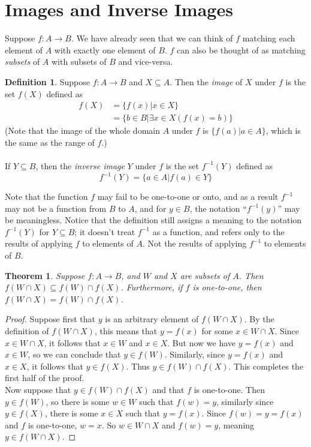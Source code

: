 \documentclass{report}
\newtheorem*{theorem}{Theorem}
\theoremstyle{definition}
\newtheorem*{definition}{Definition}
\begin{document}
\section{Images and Inverse Images}
Suppose $f:A\to B$. We have already seen that we can think of $f$ matching each element of $A$ with exactly one element of $B$. $f$ can also be thought of as
matching \textit{subsets} of $A$ with subsets of $B$ and vice-versa.
\begin{definition}
Suppose $f:A\to B$ and $X\subseteq A$. Then the \textit{image} of $X$ under $f$ is the set $f(X)$
defined as
\begin{align*}
f(X)&=\{f(x)|x\in X\}\\
&=\{b\in B|\exists x\in X(f(x)=b)\}
\end{align*}
(Note that the image of the whole domain $A$ under $f$ is $\{f(a)|a\in A\}$, which is the same as the range of $f$.)\\
\vspace{1mm}\\
If $Y\subseteq B$, then the \textit{inverse image} $Y$ under $f$ is the set $f^{-1}(Y)$ defined as
\begin{equation*}
f^{-1}(Y)=\{a\in A|f(a)\in Y\}
\end{equation*}
\end{definition}
\noindent Note that the function $f$ may fail to be one-to-one or onto, and as a result $f^{-1}$ may not be a function from $B$ to $A$, and for $y\in B$, the notation 
``$f^{-1}(y)$'' may be meaningless.
Notice that the definition still assigns a meaning to the notation $f^{-1}(Y)$ for $Y\subseteq B$; 
it doesn't treat $f^{-1}$ as a function, and refers only to the results of applying $f$ to elements
of $A$. Not the results of applying $f^{-1}$ to elements of $B$.
\begin{theorem}
Suppose $f:A\to B$, and $W$ and $X$ are subsets of $A$. Then $f(W\cap X)\subseteq f(W)\cap f(X)$. Furthermore, if $f$ is one-to-one, then $f(W\cap X)=f(W)\cap f(X)$.
\end{theorem}
\begin{proof}
Suppose first that $y$ is an arbitrary element of $f(W\cap X)$. By the definition of $f(W\cap X)$, this means that $y=f(x)$ for some $x\in W\cap X$. Since $x\in W\cap X$, it follows that 
$x\in W$ and $x\in X$. But now we have $y=f(x)$ and $x\in W$, so we can conclude that 
$y\in f(W)$. Similarly, since $y=f(x)$ and $x\in X$, it follows that $y\in f(X)$. 
Thus $y\in f(W)\cap f(X)$. This completes the first half of the proof.\\
\indent Now suppose that $y\in f(W)\cap f(X)$ and that $f$ is one-to-one. 
Then $y\in f(W)$, so there is some $w\in W$ such that $f(w)=y$, similarly since $y\in f(X)$, there is some $x\in X$ such that 
$y=f(x)$.
Since $f(w)=y=f(x)$ and $f$ is one-to-one, $w=x$. So $w\in W\cap X$ and $f(w)=y$, meaning 
$y\in f(W\cap X)$. 
\end{proof}
\newpage
\end{document}

